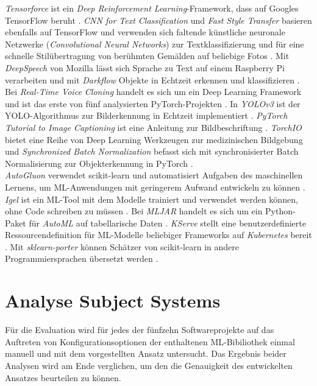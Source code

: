 \documentclass[german,bachelor]{swsLeipzig}
\begin{document}
\textit{Tensorforce} ist ein \textit{Deep Reinforcement Learning}-Framework, dass auf Googles TensorFlow beruht \cite[]{tensorforce}.
\textit{CNN for Text Classification} und \textit{Fast Style Transfer} basieren ebenfalls auf TensorFlow und verwenden
sich faltende künstliche neuronale Netzwerke (\textit{Convolutional Neural Networks}) zur Textklassifizierung \cite[]{CNN_for_Text_Classification} und für eine
schnelle Stilübertragung von berühmten Gemälden auf beliebige Fotos \cite[]{Fast_Style_Transfer}.
Mit \textit{DeepSpeech} von Mozilla lässt sich Sprache zu Text auf einem Raspberry Pi verarbeiten \cite[]{DeepSpeech} und mit
\textit{Darkflow} Objekte in Echtzeit erkennen und klassifizieren \cite[]{Darkflow}.\\

Bei \textit{Real-Time Voice Cloning} handelt es sich um ein Deep Learning Framework und ist das erste von fünf
analysierten PyTorch-Projekten \cite[]{Charles2013}.
In \textit{YOLOv3} ist der YOLO-Algorithmus zur Bilderkennung in Echtzeit implementiert \cite[]{YOLO_v3}.
\textit{PyTorch Tutorial to Image Captioning} ist eine Anleitung zur Bildbeschriftung \cite[]{a_PyTorch_Tutorial_to_Image_Captioning}.
\textit{TorchIO} bietet eine Reihe von Deep Learning Werkzeugen zur medizinischen Bildgebung \cite[]{perez-garcia_torchio_2021}
und \textit{Synchronized Batch Normalization} befasst sich mit synchronisierter Batch Normalisierung zur
Objekterkennung in PyTorch \cite[]{Synchronized_Batchnorm}.\\

\textit{AutoGluon} verwendet scikit-learn und automatisiert Aufgaben des maschinellen Lernens, um ML-Anwendungen mit geringerem
Aufwand entwickeln zu können \cite[]{agtabular}.
\textit{Igel} ist ein ML-Tool mit dem Modelle trainiert und verwendet werden können, ohne Code schreiben zu müssen \cite[]{igel}.
Bei \textit{MLJAR} handelt es sich um ein Python-Paket für \textit{AutoML} auf tabellarische Daten \cite[]{mljar}.
\textit{KServe} stellt eine benutzerdefinierte Ressourcendefinition für ML-Modelle beliebiger Frameworks
auf \textit{Kubernetes} bereit \cite[]{KServe}.
Mit \textit{sklearn-porter} können Schätzer von scikit-learn in andere Programmiersprachen übersetzt werden \cite[]{sklearn_porter}.

\section{Analyse Subject Systems}
Für die Evaluation wird für jedes der fünfzehn Softwareprojekte auf das Auftreten von Konfigurationsoptionen der enthaltenen ML-Bibiliothek
einmal manuell und mit dem vorgestellten Ansatz untersucht.
Das Ergebnis beider Analysen wird am Ende verglichen, um den die Genauigkeit des entwickelten Ansatzes beurteilen zu können.\\
\end{document}
